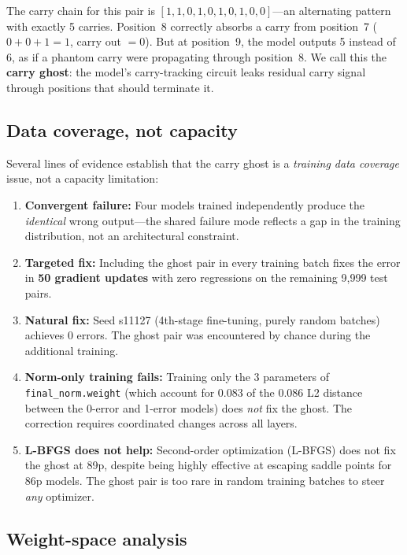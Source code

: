 \documentclass[11pt]{article}
\begin{document}
The carry chain for this pair is $[1,1,0,1,0,1,0,1,0,0]$---an
alternating pattern with exactly 5 carries. Position~8 correctly absorbs
a carry from position~7 ($0+0+1=1$, carry out $=0$). But at position~9,
the model outputs 5 instead of 6, as if a phantom carry were propagating
through position~8. We call this the \textbf{carry ghost}: the model's
carry-tracking circuit leaks residual carry signal through positions that
should terminate it.

\subsection{Data coverage, not capacity}

Several lines of evidence establish that the carry ghost is a
\emph{training data coverage} issue, not a capacity limitation:

\begin{enumerate}[leftmargin=*, itemsep=2pt]
  \item \textbf{Convergent failure:} Four models trained independently
    produce the \emph{identical} wrong output---the shared failure mode
    reflects a gap in the training distribution, not an architectural
    constraint.
  \item \textbf{Targeted fix:} Including the ghost pair in every training
    batch fixes the error in \textbf{50 gradient updates} with zero
    regressions on the remaining 9,999 test pairs.
  \item \textbf{Natural fix:} Seed s11127 (4th-stage fine-tuning, purely
    random batches) achieves 0 errors. The ghost pair was encountered by
    chance during the additional training.
  \item \textbf{Norm-only training fails:} Training only the 3 parameters of
    \texttt{final\_norm.weight} (which account for 0.083 of the 0.086 L2
    distance between the 0-error and 1-error models) does \emph{not} fix the
    ghost. The correction requires coordinated changes across all layers.
  \item \textbf{L-BFGS does not help:} Second-order optimization (L-BFGS)
    does not fix the ghost at 89p, despite being highly effective at
    escaping saddle points for 86p models. The ghost pair is too rare
    in random training batches to steer \emph{any} optimizer.
\end{enumerate}

\subsection{Weight-space analysis}
\end{document}
